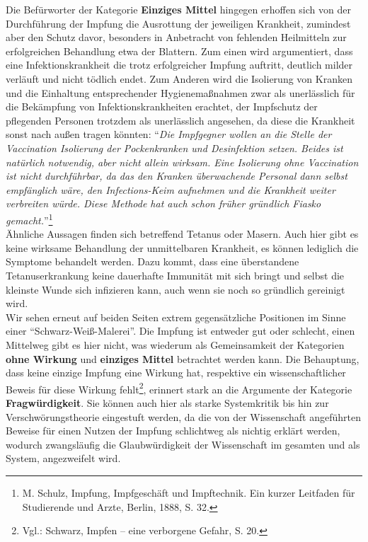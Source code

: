 \documentclass[
    a4paper,
    12pt,
    hyphens,
    chapterprefix=true,
    headheight=33pt,
    footheight=29pt,
    headings=optiontohead, %
]{scrartcl}
\begin{document}
{Die Befürworter der Kategorie \textbf{Einziges Mittel} hingegen erhoffen sich von der Durchführung der Impfung die Ausrottung der jeweiligen Krankheit, zumindest aber den Schutz davor, besonders in Anbetracht von fehlenden Heilmitteln zur erfolgreichen Behandlung etwa der Blattern. Zum einen wird argumentiert, dass eine Infektionskrankheit die trotz erfolgreicher Impfung auftritt, deutlich milder verläuft und nicht tödlich endet. Zum Anderen wird die Isolierung von Kranken und die Einhaltung entsprechender Hygienemaßnahmen zwar als unerlässlich für die Bekämpfung von Infektionskrankheiten erachtet, der Impfschutz der pflegenden Personen trotzdem als unerlässlich angesehen, da diese die Krankheit sonst nach außen tragen könnten: "`\textit{Die Impfgegner wollen an die Stelle der Vaccination Isolierung der Pockenkranken und Desinfektion setzen. Beides ist natürlich notwendig, aber nicht allein wirksam. Eine Isolierung ohne Vaccination ist nicht durchführbar, da das den Kranken überwachende Personal dann selbst empfänglich wäre, den Infections-Keim aufnehmen und die Krankheit weiter verbreiten würde. Diese Methode hat auch schon früher gründlich Fiasko gemacht.}"'\footnote{M. Schulz, Impfung, Impfgeschäft und Impftechnik. Ein kurzer Leitfaden für Studierende und Arzte, Berlin, 1888, S. 32.}\\
Ähnliche Aussagen finden sich betreffend Tetanus oder Masern. Auch hier gibt es keine wirksame Behandlung der unmittelbaren Krankheit, es können lediglich die Symptome behandelt werden. Dazu kommt, dass eine überstandene Tetanuserkrankung keine dauerhafte Immunität mit sich bringt und selbst die kleinste Wunde sich infizieren kann, auch wenn sie noch so gründlich gereinigt wird.\\
Wir sehen erneut auf beiden Seiten extrem gegensätzliche Positionen im Sinne einer "`Schwarz-Weiß-Malerei"'. Die Impfung ist entweder gut oder schlecht, einen Mittelweg gibt es hier nicht, was wiederum als Gemeinsamkeit der Kategorien \textbf{ohne Wirkung} und \textbf{einziges Mittel} betrachtet werden kann. Die Behauptung, dass keine einzige Impfung eine Wirkung hat, respektive ein wissenschaftlicher Beweis für diese Wirkung fehlt\footnote{Vgl.: Schwarz, Impfen -- eine verborgene Gefahr, S. 20.}, erinnert stark an die Argumente der Kategorie \textbf{Fragwürdigkeit}. Sie können auch hier als starke Systemkritik bis hin zur Verschwörungstheorie eingestuft werden, da die von der Wissenschaft angeführten Beweise für einen Nutzen der Impfung schlichtweg als nichtig erklärt werden, wodurch zwangsläufig die Glaubwürdigkeit der Wissenschaft im gesamten und als System, angezweifelt wird.



}
\end{document}
